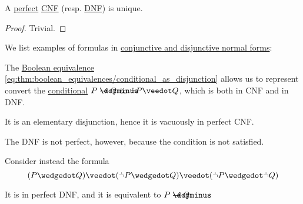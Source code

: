 \begin{proposition}\label{thm:perfect_cnf_and_dnf_uniqueness}
  A \hyperref[def:perfect_cnf_and_dnf]{perfect} \hyperref[def:cnf_and_dnf]{CNF} (resp. \hyperref[def:cnf_and_dnf]{DNF}) is unique.
\end{proposition}
\begin{proof}
  Trivial.
\end{proof}

\begin{example}\label{ex:def:cnf_and_dnf}
  We list examples of formulas in \hyperref[def:cnf_and_dnf]{conjunctive and disjunctive normal forms}:
  \begin{thmenum}
     The \hyperref[thm:boolean_equivalences]{Boolean equivalence} \eqref{eq:thm:boolean_equivalences/conditional_as_disjunction} allows us to represent convert the \hyperref[def:propositional_alphabet/connectives/conditional]{conditional} \( P \synimplies Q \) to \( \synneg P \synvee Q \), which is both in CNF and in DNF.

    It is an elementary disjunction, hence it is vacuously in perfect CNF.

    The DNF is not perfect, however, because the condition  is not satisfied.

     Consider instead the formula
    \begin{equation*}
      (P \synwedge Q) \synvee (\synneg P \synwedge Q) \synvee (\synneg P \synwedge \synneg Q)
    \end{equation*}

    It is in perfect DNF, and it is equivalent to \( P \synimplies Q \).
  \end{thmenum}
\end{example}

